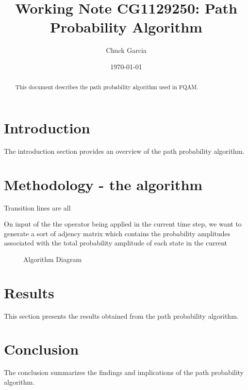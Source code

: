 \documentclass[12pt]{article}
\title{Working Note CG1129250: Path Probability Algorithm}
\author{Chuck Garcia}
\date{\today}
\begin{document}
\maketitle

\begin{abstract}

This document describes the path probability algorithm used in FQAM.

\end{abstract}

\section{Introduction}
The introduction section provides an overview of the path probability algorithm.

\section{Methodology - the algorithm}

Transition lines are all 

On input of the the operator being applied in the current time step, we want to generate a sort of adjency matrix which contains the probability amplitudes associated with the total probability amplitude of each state in the current



\begin{figure}[h]
  \begin{center}
      \FlaAlgorithm
  \end{center}
  \caption{Algorithm Diagram}
\end{figure}

\section{Results}
This section presents the results obtained from the path probability algorithm.

\section{Conclusion}
The conclusion summarizes the findings and implications of the path probability algorithm.
\end{document}
